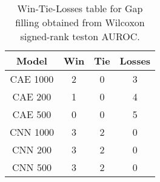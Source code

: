 \begin{table}[H]
\centering
\begin{tabular}{|c|c|c|c|}

\textbf{Model} &  \textbf{Win} &  \textbf{Tie} &  \textbf{Losses} \\
\hline

      CAE 1000 &             2 &             0 &                3 \\
\hline
       CAE 200 &             1 &             0 &                4 \\
\hline
       CAE 500 &             0 &             0 &                5 \\
\hline
      CNN 1000 &             3 &             2 &                0 \\
\hline
       CNN 200 &             3 &             2 &                0 \\
\hline
       CNN 500 &             3 &             2 &                0 \\
\hline

\end{tabular}
\caption{Win-Tie-Losses table for Gap filling obtained from Wilcoxon signed-rank teston AUROC.}
\label{tab:gap_filling_model_comparison}
\end{table}